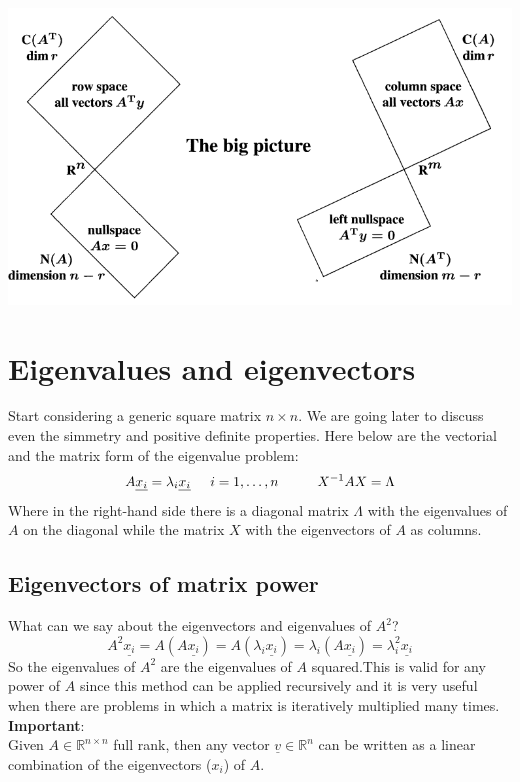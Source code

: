 \begin{center}
    \includegraphics[scale = 0.4]{../images/SpacesDimensions.png}
\end{center}


\section{Eigenvalues and eigenvectors}
Start considering a generic square matrix $n \times n$. We are going later to discuss even the simmetry and positive definite properties.
Here below are the vectorial and the matrix form of the eigenvalue problem:
\[
    A\underline{x_i} = \lambda_i\underline{x_i} \hspace{0.5cm} i = 1, \dots, n \hspace{1cm} X^{-1}AX = \Lambda
\]
Where in the right-hand side there is a diagonal matrix $\Lambda$ with the eigenvalues of $A$ on the diagonal while the matrix $X$ with the eigenvectors of $A$ as columns.\\

\subsection{Eigenvectors of matrix power}
What can we say about the eigenvectors and eigenvalues of $A^2$?
\[
    A^2\underline{x_i} = A(A\underline{x_i}) = A(\lambda_i\underline{x_i}) = \lambda_i(A\underline{x_i}) = \lambda_i^2\underline{x_i}    
\]
So the eigenvalues of $A^2$ are the eigenvalues of $A$ squared.This is valid for any power of $A$ since this method can be applied recursively and it is very useful when there are problems in which a matrix is iteratively multiplied many times. \\

\textbf{Important}:\\
Given $A\in \mathbb{R}^{n\times n}$ full rank, then any vector $\underline{v} \in \mathbb{R}^n$ can be written as a linear combination of the eigenvectors ($x_i$) of $A$.\\

